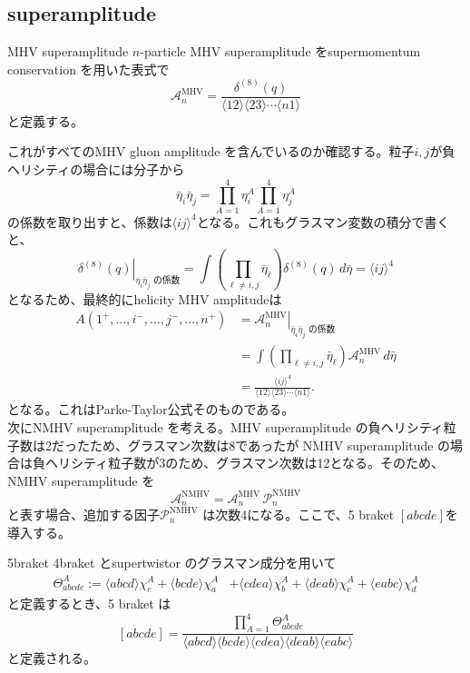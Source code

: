 \documentclass[uplatex,dvipdfmx,a4paper,11pt]{jsarticle}
\numberwithin{equation}{section}
\begin{document}
\subsection{superamplitude}
\begin{mydef}{MHV superamplitude}
$n$-particle MHV superamplitude をsupermomentum conservation を用いた表式で
\begin{equation}
  \mathcal A_n^{\mathrm{MHV}}
=
\frac{\delta^{(8)}(q)}
{\langle12\rangle\langle23\rangle\cdots\langle n1\rangle}
\end{equation}
と定義する。
\end{mydef}
これがすべてのMHV gluon amplitude を含んでいるのか確認する。粒子$i,j$が負ヘリシティの場合には分子から
\[
\bar\eta_i\bar\eta_j
=
\prod_{A=1}^{4}\eta_i^A
\prod_{A=1}^{4}\eta_j^A
\]
の係数を取り出すと、係数は$\langle ij\rangle^4$となる。これもグラスマン変数の積分で書くと、
\[
\left.
\delta^{(8)}(q)
\right|_{\bar\eta_i\bar\eta_j\text{ の係数}}
=
\int
\left(
\prod_{\ell\neq i,j}\bar\eta_\ell
\right)
\delta^{(8)}(q)\,d\bar\eta
=
\langle ij\rangle^{4}
\]
となるため、最終的にhelicity MHV amplitudeは
\[
\begin{aligned}
A(1^+,\ldots,i^-,\ldots,j^-,\ldots,n^+)
&=
\left.
\mathcal A_n^{\mathrm{MHV}}
\right|_{\bar\eta_i\bar\eta_j\text{ の係数}}\\
&=
\int
\left(
\prod_{\ell\neq i,j}\bar\eta_\ell
\right)
\mathcal A_n^{\mathrm{MHV}}\,d\bar\eta\\
&=
\frac{\langle ij\rangle^4}
{\langle12\rangle\langle23\rangle\cdots\langle n1\rangle}.
\end{aligned}
\]
となる。これはParke-Taylor公式そのものである。\\
次にNMHV superamplitude を考える。MHV superamplitude の負ヘリシティ粒子数は2だったため、グラスマン次数は8であったが
NMHV superamplitude の場合は負ヘリシティ粒子数が3のため、グラスマン次数は12となる。そのため、NMHV superamplitude を
\[
\mathcal A_n^{\mathrm{NMHV}}
=
\mathcal A_n^{\mathrm{MHV}}\,
\mathcal P_n^{\mathrm{NMHV}}
\]
と表す場合、追加する因子\(\mathcal P_n^{\mathrm{NMHV}}\) は次数4になる。ここで、5 braket \([abcde]\)を導入する。\newpage
\begin{mydef}{5braket}
  4braket とsupertwistor のグラスマン成分を用いて
\[
\begin{aligned}
\Theta_{abcde}^A
:={}
\langle abcd\rangle\chi_e^A
+\langle bcde\rangle\chi_a^A
&+\langle cdea\rangle\chi_b^A
+\langle deab\rangle\chi_c^A
+\langle eabc\rangle\chi_d^A
\end{aligned}
\]
と定義するとき、5 braket は
\[
[abcde]
=
\frac{
\displaystyle\prod_{A=1}^{4}\Theta_{abcde}^A
}{
\langle abcd\rangle
\langle bcde\rangle
\langle cdea\rangle
\langle deab\rangle
\langle eabc\rangle
}
\]
と定義される。
\end{mydef}
\end{document}

